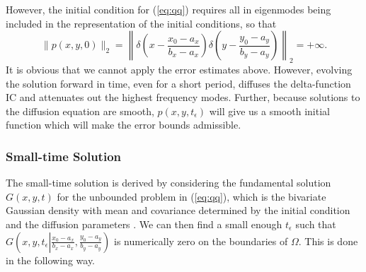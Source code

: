 \documentclass[10pt]{article}
\begin{document}
However, the initial condition for (\ref{eq:qq}) requires all in
eigenmodes being included in the representation of the initial
conditions, so that
\[
  \| p(x,y,0) \|_{2} = \left\| \delta\left( x - \frac{x_0 - a_x}{b_x-a_x}
  \right) \delta\left( y - \frac{y_0 - a_y}{b_y-a_y} \right)\right\|_{2} = +\infty.
\]
It is obvious that we cannot apply the error estimates above. However,
evolving the solution forward in time, even for a short period,
diffuses the delta-function IC and attenuates out the highest
frequency modes. Further, because solutions to the diffusion equation
are smooth, $p(x,y,t_\epsilon)$ will give us a smooth initial function
which will make the error bounds admissible.

\subsubsection{Small-time Solution}
The small-time solution is derived by considering the fundamental
solution $G(x,y,t)$ for the unbounded problem in (\ref{eq:qq}), which
is the bivariate Gaussian density with mean and covariance determined
by the initial condition and the diffusion parameters
\citep{stakgold2011green}. We can then find a small enough
$t_\epsilon$ such that
$G\left(x,y, t_\epsilon \left| \frac{x_0-a_x}{b_x - a_x},
    \frac{y_0-a_y}{b_y - a_y} \right.\right)$ is numerically zero on
the boundaries of $\Omega$. This is done in the following way.
\end{document}
